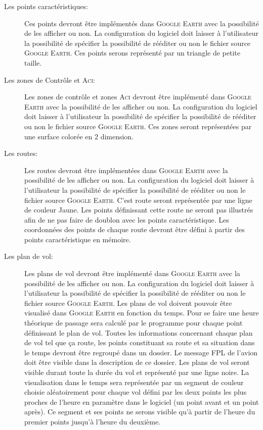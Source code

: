 \begin{description}
    \item[Les points caractéristiques:] Ces points devront être implémentés dans \textsc{Google Earth} avec la possibilité de les afficher ou non. La configuration du logiciel doit laisser à l'utilisateur la possibilité de spécifier la possibilité de rééditer ou non le fichier source \textsc{Google Earth}. Ces points serons représenté par un triangle de petite taille.

    \item[Les zones de Contrôle et \textsc{Aci}:] Les zones de contrôle et zones \textsc{Aci} devront être implémenté dans \textsc{Google Earth} avec la possibilité de les afficher ou non. La configuration du logiciel doit laisser à l'utilisateur la possibilité de spécifier la possibilité de rééditer ou non le fichier source \textsc{Google Earth}. Ces zones seront représentées par une surface colorée en 2 dimension.

    \item[Les routes:] Les routes devront être implémentées dans \textsc{Google Earth} avec la possibilité de les afficher ou non. La configuration du logiciel doit laisser à l'utilisateur la possibilité de spécifier la possibilité de rééditer ou non le fichier source \textsc{Google Earth}. C'est route seront représentée par une ligne de couleur Jaune. Les points définissant cette route ne seront pas illustrés afin de ne pas faire de doublon avec les points caractéristique. Les coordonnées des points de chaque route devront être défini à partir des points caractéristique en mémoire.

    \item[Les plan de vol:] Les plans de vol devront être implémenté dans \textsc{Google Earth} avec la possibilité de les afficher ou non. La configuration du logiciel doit laisser à l'utilisateur la possibilité de spécifier la possibilité de rééditer ou non le fichier source \textsc{Google Earth}. Les plans de vol doivent pouvoir être visualisé dans \textsc{Google Earth} en fonction du temps. Pour se faire une heure théorique de passage sera calculé par le programme pour chaque point définissant le plan de vol. Toutes les informations concernant chaque plan de vol tel que ça route, les points constituant sa route et sa situation dans le temps devront être regroupé dans un dossier. Le message FPL de l'avion doit être visible dans la description de ce dossier. Les plans de vol seront visible durant toute la durée du vol et représenté par une ligne noire. La visualisation dans le temps sera représentée par un segment de couleur choisie aléatoirement pour chaque vol défini par les deux points les plus proches de l'heure en paramètre dans le logiciel (un point avant et un point après). Ce segment et ses points ne serons visible qu'à partir de l'heure du premier points jusqu'à l'heure du deuxième. 


\end{description}
